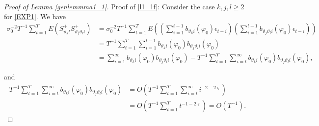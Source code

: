 {{\begin{proof}[Proof of Lemma \ref{genlemmma1_1}]
Proof of \eqref{l1_1f}: Consider the case $k,j,l \geq 2$ for \eqref{EXP1}. We have 
\begin{align*}
    \sigma_0^{-2} T^{-1} \sum_{t = 1}^T  E \left( S_{\vartheta_k t}^+ S_{\vartheta_j \vartheta_l t}^+  \right) &=   \sigma_0^{-2} T^{-1} \sum_{t = 1}^T  E \left( \left( \sum_{i = 1}^{t-1} b_{\vartheta_k i}(\varphi_0)  \epsilon_{t-i}  \right) \left(\sum_{i = 1}^{t-1} b_{\vartheta_j \vartheta_l i}(\varphi_0)  \epsilon_{t-i} \right) \right) \\
    &=   T^{-1} \sum_{t = 1}^T  \sum_{i = 1}^{t-1}  b_{\vartheta_k i}(\varphi_0)   b_{\vartheta_j \vartheta_l i}(\varphi_0) \\
    &= \sum_{i = 1}^{\infty}   b_{\vartheta_k i}(\varphi_0)   b_{\vartheta_j \vartheta_l i}(\varphi_0) -  T^{-1} \sum_{t = 1}^T  \sum_{i = t}^{\infty}   b_{\vartheta_k i}(\varphi_0)   b_{\vartheta_j \vartheta_l i}(\varphi_0), 
\end{align*}

and 
\begin{align*}
 T^{-1} \sum_{t = 1}^T  \sum_{i = t}^{\infty}   b_{\vartheta_k i}(\varphi_0)   b_{\vartheta_j \vartheta_l i}(\varphi_0) &= O( T^{-1} \sum_{t = 1}^T  \sum_{i = t}^{\infty}  i^{-2-2\varsigma} ) \\
 &= O( T^{-1} \sum_{t = 1}^T    t^{-1-2\varsigma} ) =   O( T^{-1}) .
\end{align*}


\end{proof}



}}
